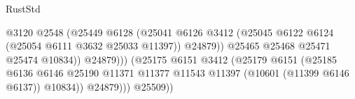 \begin{lexlean}{RustStd}
\begin{coremodule}
                                                            @3120
                                                            @2548
                                                            (@25449
                                                              @6128
                                                              (@25041
                                                                @6126
                                                                @3412
                                                                (@25045
                                                                  @6122
                                                                  @6124
                                                                  (@25054
                                                                    @6111
                                                                    @3632
                                                                    @25033
                                                                    @11397))
                                                                @24879))
                                                            @25465
                                                            @25468
                                                            @25471
                                                            @25474
                                                            @10834))
                                                        @24879)))
                                                  (@25175
                                                    @6151
                                                    @3412
                                                    (@25179
                                                      @6151
                                                      (@25185
                                                        @6136
                                                        @6146
                                                        @25190
                                                        @11371
                                                        @11377
                                                        @11543
                                                        @11397
                                                        (@10601 (@11399 @6146 @6137))
                                                        @10834))
                                                    @24879)))
                                              @25509))

\end{coremodule}
\end{lexlean}
